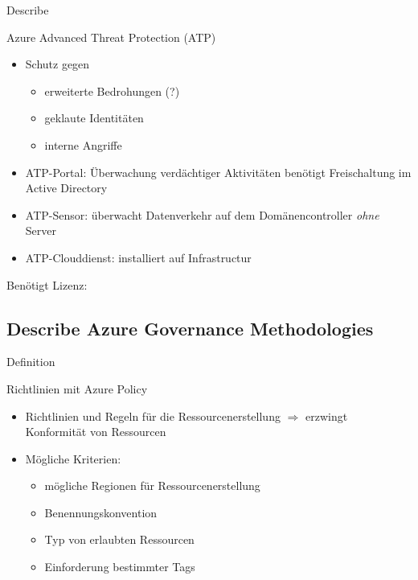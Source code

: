 \documentclass{scrartcl}
\newenvironment{flashcard}[2][]{%
    #1
    \vfill
    \centerline{\Large{#2}}
    \vfill
\newpage
}
{\newpage}
\newcommand{\subsectioncard}[1]{
    \vspace*{\stretch{1}}
    \subsection{#1}
    \vspace*{\stretch{1}}
    \pagebreak
}
\begin{document}
    \begin{flashcard}[Describe]{Azure Advanced Threat Protection (ATP)}
        \begin{itemize}
            \item Schutz gegen 
            \begin{itemize}
                \item erweiterte Bedrohungen (?)
                \item geklaute Identitäten
                \item interne Angriffe
            \end{itemize}
            \item ATP-Portal: Überwachung verdächtiger Aktivitäten\newline
                benötigt Freischaltung im Active Directory
            \item ATP-Sensor: überwacht Datenverkehr auf dem Domänencontroller \emph{ohne} Server
            \item ATP-Clouddienst: installiert auf Infrastructur
        \end{itemize}
        Benötigt Lizenz:
    \end{flashcard}

    \subsectioncard{Describe Azure Governance Methodologies}

    \begin{flashcard}[Definition]{Richtlinien mit Azure Policy}
        \begin{itemize}
            \item Richtlinien und Regeln für die Ressourcenerstellung\newline
            $\Rightarrow$ erzwingt Konformität von Ressourcen
            \item Mögliche Kriterien:
            \begin{itemize}
                \item mögliche Regionen für Ressourcenerstellung
                \item Benennungskonvention
                \item Typ von erlaubten Ressourcen
                \item Einforderung bestimmter Tags
            \end{itemize}

        \end{itemize}
    \end{flashcard}
\end{document}
